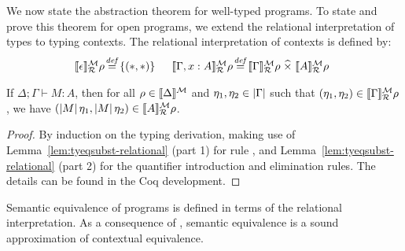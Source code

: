 We now state the abstraction theorem for well-typed programs. To state
and prove this theorem for open programs, we extend the
relational interpretation of types to typing contexts. The relational
interpretation of contexts is defined by: %
\begin{displaymath}
  \begin{array}{@{}l@{\hspace{0.1em}\isDefinedAs\hspace{0.1em}}l@{\hspace{1.5em}}l@{\hspace{0.1em}\isDefinedAs\hspace{0.1em}}l}
    \rsem{\epsilon} M R{\rho} & \{(*,*)\} &
    \rsem{\Gamma, x : A} M R{\rho} & \rsem{\Gamma} M R\rho \relTimes \rsem{A} M R\rho
  \end{array}
\end{displaymath}

\begin{theorem}[Abstraction]\label{thm:abstraction}
  If $\Delta; \Gamma \vdash M :
  A$, then for all $\rho \in \llbracket \Delta \rrbracket^{\mathcal{M}}$ and $\eta_1, \eta_2
  \in \left| \Gamma\right|$ such that $(\eta_1, \eta_2) \in
  \llbracket \Gamma \rrbracket^{\mathcal{M}}_{\mathcal{R}}\rho$, we have $(\left| M\right|\eta_1,
  \left| M\right|\eta_2) \in \llbracket A \rrbracket^{\mathcal{M}}_{\mathcal{R}}\rho$.
\end{theorem}
\begin{proof}
By induction on the typing derivation, making use of
Lemma~\ref{lem:tyeqsubst-relational} (part 1) for rule ,
and Lemma~\ref{lem:tyeqsubst-relational} (part 2) for the quantifier introduction
and elimination rules. The details can be found in the Coq development.
\end{proof}

Semantic equivalence of programs is defined in terms of the relational
interpretation. As a consequence of , semantic
equivalence is a sound approximation of contextual equivalence.

